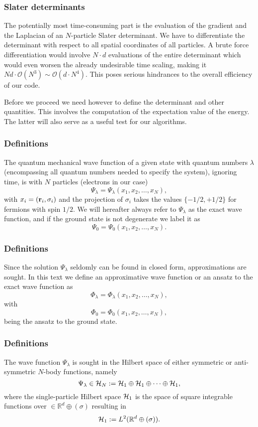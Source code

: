 \documentclass[compress]{beamer}
\newcommand{\bigO}{\mathcal{O}}
\begin{document}
\frame
{
  \frametitle{Slater determinants}
\begin{small}
{\scriptsize
The potentially most time-consuming part is the
evaluation of the gradient and the Laplacian of an $N$-particle  Slater
determinant. We have to differentiate the determinant with respect to
all spatial coordinates of all particles. A brute force
differentiation would involve $N\cdot d$ evaluations of the entire
determinant which would even worsen the already undesirable time
scaling, making it $Nd\cdot\bigO(N^3)\sim \bigO(d\cdot N^4)$.
This poses serious hindrances to the overall efficiency of our code.


Before we proceed we need however to define the determinant and other quantities. This involves the computation of the expectation value of the energy. The latter will also serve as a useful test for our algorithms.
}
\end{small}
}


\frame
{
\frametitle{Definitions}
The quantum mechanical wave function of a given state with quantum numbers $\lambda$ (encompassing all quantum numbers needed to specify the system), ignoring time, is with $N$ particles (electrons in our case)
\[
\Psi_{\lambda}=\Psi_{\lambda}(x_1,x_2,\dots,x_N),
\]
with $x_i=({\bf r}_i,\sigma_i)$ and the projection of $\sigma_i$ takes the values
$\{-1/2,+1/2\}$ for fermions with spin $1/2$. 
We will hereafter always refer to $\Psi_{\lambda}$ as the exact wave function, and if the ground state is not degenerate we label it as 
\[
\Psi_0=\Psi_0(x_1,x_2,\dots,x_N).
\]

}


\frame
{
\frametitle{Definitions}
Since the solution $\Psi_{\lambda}$ seldomly can be found in closed form, approximations are sought. In this text we define an approximative wave function or an ansatz to the exact wave function as 
\[
\Phi_{\lambda}=\Phi_{\lambda}(x_1,x_2,\dots,x_N),
\]
with 
\[
\Phi_0=\Phi_0(x_1,x_2,\dots,x_N),
\]
being the ansatz to the ground state.  
}


\frame
{
\frametitle{Definitions}
The wave function $\Psi_{\lambda}$ is sought in the Hilbert space of either symmetric or anti-symmetric $N$-body functions, namely
\[
\Psi_{\lambda}\in {\cal H}_N:= {\cal H}_1\oplus{\cal H}_1\oplus\dots\oplus{\cal H}_1,
\]
where the single-particle Hilbert space ${\cal H}_1$ is the space of square integrable functions over
$\in {\mathbb{R}}^{d}\oplus (\sigma)$
resulting in
\[
{\cal H}_1:= L^2(\mathbb{R}^{d}\oplus (\sigma)).
\]
}
\end{document}
